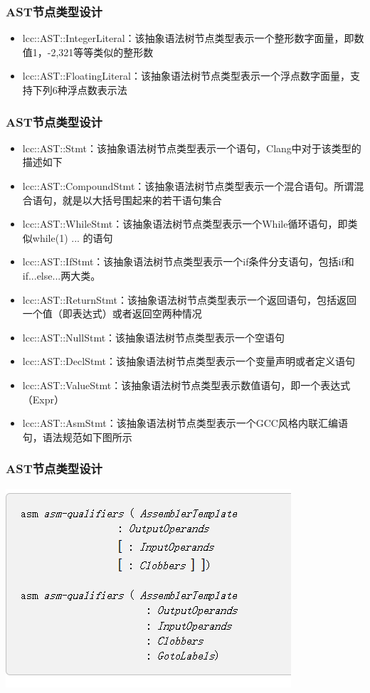 \begin{frame}
    \frametitle{AST节点类型设计}
    \footnotesize
    \begin{itemize}
        \item {lcc::AST::IntegerLiteral：该抽象语法树节点类型表示一个整形数字面量，即数值1，-2,321等等类似的整形数}
        \item {lcc::AST::FloatingLiteral：该抽象语法树节点类型表示一个浮点数字面量，支持下列6种浮点数表示法}
    \end{itemize}
\end{frame}

\begin{frame}
    \frametitle{AST节点类型设计}
    \footnotesize
    \begin{itemize}
        \item {lcc::AST::Stmt：该抽象语法树节点类型表示一个语句，Clang中对于该类型的描述如下}
        \item {lcc::AST::CompoundStmt：该抽象语法树节点类型表示一个混合语句。所谓混合语句，就是以大括号围起来的若干语句集合}
        \item {lcc::AST::WhileStmt：该抽象语法树节点类型表示一个While循环语句，即类似while(1){ ... }的语句}
        \item {lcc::AST::IfStmt：该抽象语法树节点类型表示一个if条件分支语句，包括if和if...else...两大类。}
        \item {lcc::AST::ReturnStmt：该抽象语法树节点类型表示一个返回语句，包括返回一个值（即表达式）或者返回空两种情况}
        \item {lcc::AST::NullStmt：该抽象语法树节点类型表示一个空语句}
        \item {lcc::AST::DeclStmt：该抽象语法树节点类型表示一个变量声明或者定义语句}
        \item {lcc::AST::ValueStmt：该抽象语法树节点类型表示数值语句，即一个表达式（Expr）}
        \item {lcc::AST::AsmStmt：该抽象语法树节点类型表示一个GCC风格内联汇编语句，语法规范如下图所示}
    \end{itemize}
\end{frame}

\begin{frame}
    \frametitle{AST节点类型设计}
    \footnotesize
    \includegraphics[width=\textwidth]{contents/figure/asm.png}
\end{frame}

